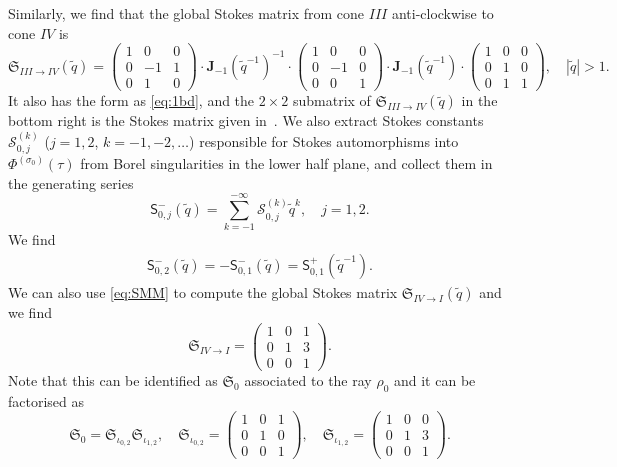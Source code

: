 \documentclass[12pt,reqno]{amsart}
\theoremstyle{definition}
\def\s{\sigma}
\def\tq{\tilde{q}}
\def\bJ{\mathbf J}
\def\mc{\mathcal}
\def\mf{\mathfrak}
\def\ms{\mathsf}
\begin{document}
Similarly, we find that the global Stokes matrix from cone $III$
anti-clockwise to cone $IV$ is 
\begin{equation}
  \mf{S}_{III\rightarrow IV}(\tq) =
  \begin{pmatrix}
    1&0&0\\
    0&-1&1\\
    0&1&0
  \end{pmatrix}\cdot \bJ_{-1}(\tq^{-1})^{-1}\cdot
  \begin{pmatrix}
    1&0&0\\
    0&-1&0\\
    0&0&1
  \end{pmatrix}
  \cdot \bJ_{-1}(\tq^{-1})\cdot
  \begin{pmatrix}
    1&0&0\\
    0&1&0\\
    0&1&1
  \end{pmatrix},\quad |\tq|>1.\label{eq:S34}
\end{equation}
It also has the form as \eqref{eq:1bd}, and the $2\times 2$ submatrix of
$\mf{S}_{III\rightarrow IV}(\tq)$ in the bottom right is the Stokes matrix
given in~\cite{GGM:resurgent}. We also extract
Stokes constants $\mc{S}_{0,j}^{(k)}$ ($j=1,2$, $k=-1,-2,\ldots$)
responsible for Stokes automorphisms into $\Phi^{(\s_0)}(\tau)$ from
Borel singularities in the lower half plane, and collect them in the
generating series
\begin{equation}
  \ms{S}^-_{0,j}(\tq) = \sum_{k=-1}^{-\infty}
  \mc{S}_{0,j}^{(k)}\tq^k,\quad j=1,2.
\end{equation}
We find
\begin{align}
  \ms{S}_{0,2}^-(\tq) = -\ms{S}_{0,1}^-(\tq) = \ms{S}_{0,1}^+(\tq^{-1}).
\end{align}
We can also use \eqref{eq:SMM} to compute the global Stokes matrix
$\mf{S}_{IV\rightarrow I}(\tq)$ and we find
\begin{equation}
  \mf{S}_{IV\rightarrow I} = 
  \begin{pmatrix}
    1&0&1\\
    0&1&3\\
    0&0&1
  \end{pmatrix}.
\end{equation}
Note that this can be identified as $\mf{S}_{0}$ associated to the ray
$\rho_0$ and it can be factorised as
\begin{equation}
  \mf{S}_{0} = \mf{S}_{\iota_{0,2}}\mf{S}_{\iota_{1,2}},\quad
  \mf{S}_{\iota_{0,2}} =
  \begin{pmatrix}
    1&0&1\\
    0&1&0\\
    0&0&1
  \end{pmatrix},\quad
  \mf{S}_{\iota_{1,2}} =
  \begin{pmatrix}
    1&0&0\\
    0&1&3\\
    0&0&1
  \end{pmatrix}.
\end{equation}
\end{document}
